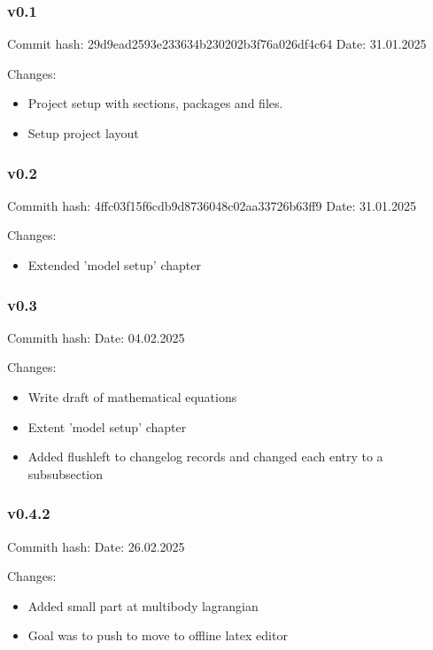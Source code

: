 \subsubsection*{v0.1}
\begin{flushleft}
Commit hash: 29d9ead2593e233634b230202b3f76a026df4c64
Date: 31.01.2025

Changes:
\begin{itemize}
    \item Project setup with sections, packages and files.
    \item Setup project layout
    
\end{itemize}
\end{flushleft}


\subsubsection*{v0.2}
\begin{flushleft}
Commith hash: 4ffc03f15f6cdb9d8736048c02aa33726b63ff9
Date: 31.01.2025

Changes:
\begin{itemize}
    \item Extended 'model setup' chapter
\end{itemize}
\end{flushleft}

\subsubsection*{v0.3}
\begin{flushleft}
Commith hash: 
Date: 04.02.2025

Changes:
\begin{itemize}
    \item Write draft of mathematical equations
    \item Extent 'model setup' chapter
    \item Added flushleft to changelog records and changed each entry to a subsubsection
\end{itemize}
\end{flushleft}

\subsubsection*{v0.4.2}
\begin{flushleft}
Commith hash: 
Date: 26.02.2025

Changes:
\begin{itemize}
    \item Added small part at multibody lagrangian
    \item Goal was to push to move to offline latex editor
\end{itemize}
\end{flushleft}

